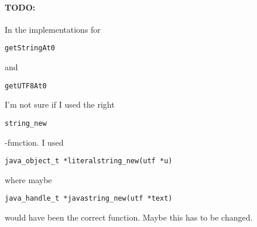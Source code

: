 \documentclass[a4paper, 10pt, titlepage]{scrartcl} %
\begin{document}
\paragraph{TODO:}
\label{par:TODO/ConstantPool.getStringAt0}In the implementations for \begin{scriptsize}\verb|getStringAt0|\end{scriptsize} and \begin{scriptsize}\verb|getUTF8At0|\end{scriptsize}
I'm not sure if I used the right \begin{scriptsize}\verb|string_new|\end{scriptsize}-function. I used
\begin{scriptsize}\verb|java_object_t|\hspace{0.0pt}\verb| |\hspace{0.0pt}\verb||\hspace{0.0pt}\verb|*|\hspace{0.0pt}\verb|literalstring_new|\hspace{0.0pt}\verb|(|\hspace{0.0pt}\verb|utf|\hspace{0.0pt}\verb| |\hspace{0.0pt}\verb||\hspace{0.0pt}\verb|*|\hspace{0.0pt}\verb|u|\hspace{0.0pt}\verb|)|\hspace{0.0pt}\verb||\end{scriptsize} where maybe
\begin{scriptsize}\verb|java_handle_t|\hspace{0.0pt}\verb| |\hspace{0.0pt}\verb||\hspace{0.0pt}\verb|*|\hspace{0.0pt}\verb|javastring_new|\hspace{0.0pt}\verb|(|\hspace{0.0pt}\verb|utf|\hspace{0.0pt}\verb| |\hspace{0.0pt}\verb||\hspace{0.0pt}\verb|*|\hspace{0.0pt}\verb|text|\hspace{0.0pt}\verb|)|\hspace{0.0pt}\verb||\end{scriptsize} would have been the correct
function. Maybe this has to be changed.
\end{document}
